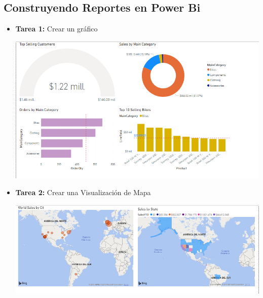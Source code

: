 \documentclass[12pt,letterpaper]{article}
\begin{document}
\subsection{ Construyendo Reportes en Power Bi}
\begin{itemize}
	\item \textbf{Tarea 1:} Crear un gráfico
	\begin{center}
	\includegraphics[width=18cm]{./Imagenes/4}
	\end{center}
	\item \textbf{Tarea 2:} Crear una Visualización de Mapa
	\begin{center}
	\includegraphics[width=18cm]{./Imagenes/5}
	\end{center}
\end{itemize}
\end{document}
